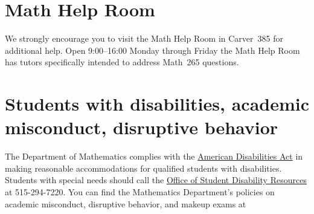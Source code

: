 \documentclass[11pt]{article}
\begin{document}
\section{Math Help Room}\label{MathCenter}
We strongly encourage you to visit the Math Help Room
in Carver~385 for additional help.
Open 9:00--16:00 Monday through Friday the Math Help Room
has tutors specifically intended to address Math~265 questions.

\section{Students with disabilities, academic misconduct, disruptive behavior}
The Department of Mathematics complies with the 
\href{http://www.ada.gov}{American Disabilities Act} in making reasonable 
accommodations for qualified students with disabilities.  Students with 
special needs should call the 
\href{http://www.dso.iastate.edu/dr}{Office of Student Disability Resources} at
515-294-7220.
You can find the Mathematics Department's policies on 
academic misconduct, disruptive behavior, and makeup exams at
\end{document}
